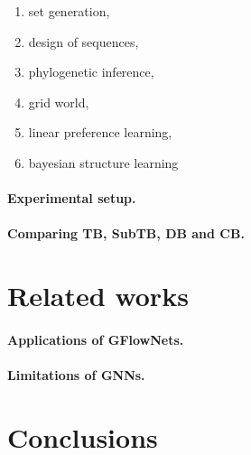 \documentclass{article}
\theoremstyle{plain}
\theoremstyle{definition}
\theoremstyle{remark}
\theoremstyle{remark}
\begin{document}
\begin{enumerate}
    \item set generation, 
    \item design of sequences, 
    \item phylogenetic inference, 
    \item grid world, 
    \item linear preference learning, 
    \item bayesian structure learning 
\end{enumerate}

\paragraph{Experimental setup.} 

\paragraph{Comparing TB, SubTB, DB and CB.} 

%  

\section{Related works} 

\paragraph{Applications of GFlowNets.} 

\paragraph{Limitations of GNNs.} 

\section{Conclusions} 


 
 

\newpage 
\onecolumn 

\appendix

 

 
\end{document}
